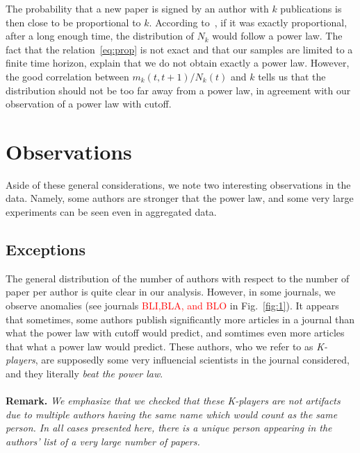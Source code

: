 \documentclass[aps,prl,floatfix,twocolumn]{revtex4-1}
\begin{document}
The probability that a new paper is signed by an author with $k$ publications is then close to be proportional to $k$. 
According to~\cite{Kra00}, if it was exactly proportional, after a long enough time, the distribution of $N_k$ would follow a power law. 
The fact that the relation~\eqref{eq:prop} is not exact and that our samples are limited to a finite time horizon, explain that we do not obtain exactly a power law. 
However, the good correlation between $m_k(t,t+1)/N_k(t)$ and $k$ tells us that the distribution should not be too far away from a power law, in agreement with our observation of a power law with cutoff.


\section{Observations}
Aside of these general considerations, we note two interesting observations in the data. 
Namely, some authors are stronger that the power law, and some very large experiments can be seen even in aggregated data. 

\subsection{Exceptions }
The general distribution of the number of authors with respect to the number of paper per author is quite clear in our analysis. 
However, in some journals, we observe anomalies (see journals \textcolor{red}{BLI,BLA, and BLO} in Fig.~\ref{fig:1}). 
It appears that sometimes, some authors publish significantly more articles in a journal than what the power law with cutoff would predict, and somtimes even more articles that what a power law would predict. 
These authors, who we refer to as \emph{K-players}, are supposedly some very influencial scientists in the journal considered, and they literally \emph{beat the power law}.

\paragraph{}
{\bf Remark.}\textit{
We emphasize that we checked that these K-players are not artifacts due to multiple authors having the same name which would count as the same person. 
In all cases presented here, there is a unique person appearing in the authors' list of a very large number of papers. 
}
\end{document}
